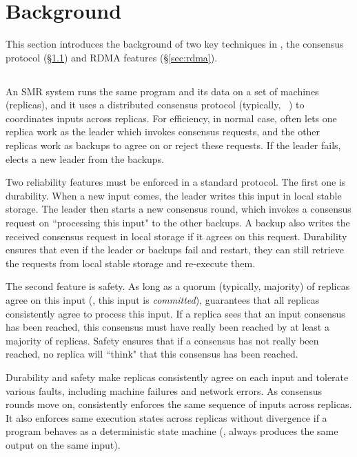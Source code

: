 \section{Background}\label{sec:background}

This section introduces the background of two key techniques in \xxx, the 
\paxos consensus protocol (\S\ref{sec:paxos}) and RDMA features 
(\S\ref{sec:rdma}).

\subsection{\paxos}\label{sec:paxos}
An SMR system runs the same program and its data on a set of machines 
(replicas), and it uses a distributed consensus protocol (typically, 
\paxos~\cite{paxos:complex,paxos,paxos:simple,paxos:live,paxos:fast,
paxos:practical}) to coordinates inputs across replicas. For efficiency, in 
normal case, \paxos often lets one replica work as the leader which invokes 
consensus requests, and the other replicas work as backups to agree on or reject 
these requests. If the leader fails, \paxos elects a new leader from the 
backups.

Two reliability features must be enforced in a standard \paxos protocol. The 
first one is durability. When a new input comes, the \paxos leader writes this 
input in local stable storage. The leader then starts a new consensus round, 
which invokes a consensus request on ``processing this input" to the other 
backups. A backup also writes the received consensus request in local storage 
if it agrees on this request. Durability ensures that even if the leader or 
backups fail and restart, they can still retrieve the requests from local stable 
storage and re-execute them.

The second feature is safety. As long as a quorum (typically, majority) of 
replicas agree on this input (\ie, this input is \emph{committed}), \paxos 
guarantees that all replicas consistently agree to process this input. If a 
replica sees that an input consensus has been reached, this consensus must have 
really been reached by at least a majority of replicas. Safety ensures that if 
a consensus has not really been reached, no replica will ``think" that this 
consensus has been reached.

Durability and safety make replicas consistently agree on each input and 
tolerate various faults, including machine failures and network errors. As 
consensus rounds move on, \paxos consistently enforces the same sequence of 
inputs across replicas. It also enforces same execution states across replicas 
without divergence if a program behaves as a deterministic state machine (\ie, 
always produces the same output on the same input).

